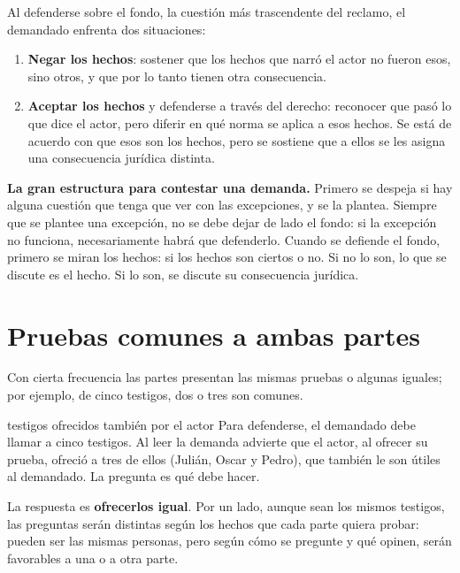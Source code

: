 \documentclass[12pt,oneside]{book}
\begin{document}
Al defenderse sobre el fondo, la cuestión más trascendente del reclamo, el demandado enfrenta dos situaciones:

\begin{enumerate}
    \item \textbf{Negar los hechos}: sostener que los hechos que narró el actor no fueron esos, sino otros, y que por lo tanto tienen otra consecuencia.
    \item \textbf{Aceptar los hechos} y defenderse a través del derecho: reconocer que pasó lo que dice el actor, pero diferir en qué norma se aplica a esos hechos. Se está de acuerdo con que esos son los hechos, pero se sostiene que a ellos se les asigna una consecuencia jurídica distinta.
\end{enumerate}

\begin{important}
\textbf{La gran estructura para contestar una demanda.} Primero se despeja si hay alguna cuestión que tenga que ver con las excepciones, y se la plantea. Siempre que se plantee una excepción, no se debe dejar de lado el fondo: si la excepción no funciona, necesariamente habrá que defenderlo. Cuando se defiende el fondo, primero se miran los hechos: si los hechos son ciertos o no. Si no lo son, lo que se discute es el hecho. Si lo son, se discute su consecuencia jurídica.
\end{important}

\section{Pruebas comunes a ambas partes}

Con cierta frecuencia las partes presentan las mismas pruebas o algunas iguales; por ejemplo, de cinco testigos, dos o tres son comunes.

\begin{example}{testigos ofrecidos también por el actor}
Para defenderse, el demandado debe llamar a cinco testigos. Al leer la demanda advierte que el actor, al ofrecer su prueba, ofreció a tres de ellos (Julián, Oscar y Pedro), que también le son útiles al demandado. La pregunta es qué debe hacer.
\end{example}

La respuesta es \textbf{ofrecerlos igual}. Por un lado, aunque sean los mismos testigos, las preguntas serán distintas según los hechos que cada parte quiera probar: pueden ser las mismas personas, pero según cómo se pregunte y qué opinen, serán favorables a una o a otra parte.
\end{document}
